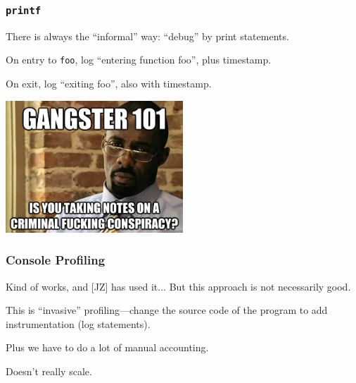 \begin{frame}
\frametitle{\texttt{printf}}


\begin{changemargin}{1.5cm}
There is always the ``informal'' way: ``debug'' by print statements.

On entry to \texttt{foo}, log ``entering function foo'', plus timestamp.

On exit, log ``exiting foo'', also with timestamp.
\end{changemargin}

\begin{center}
	\includegraphics[width=0.5\textwidth]{images/stringerbell.jpg}
\end{center}

\end{frame}



\begin{frame}
\frametitle{Console Profiling}


\begin{changemargin}{1cm}
Kind of works, and [JZ] has used it... But this approach is not necessarily good.  

This is ``invasive'' profiling---change the source code of the program to add instrumentation (log statements). 

Plus we have to do a lot of manual accounting.

Doesn't really scale.
\end{changemargin}

\end{frame}




